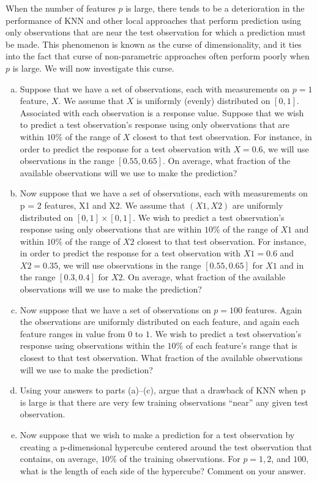 \documentclass[14pt]{elegantbook}
\begin{document}
\begin{exercise*}[4.4]
  When the number of features $p$ is large, there tends to be a deterioration in the performance of KNN and other local approaches that perform prediction using only observations that are near the test observation for which a prediction must be made. This phenomenon is known as the curse of dimensionality, and it ties into the fact that curse of non-parametric approaches often perform poorly when $p$ is large. We will now investigate this curse. 
  \begin{enumerate}[(a)]
    \item Suppose that we have a set of observations, each with measurements on $p = 1$ feature, $X$. We assume that $X$ is uniformly (evenly) distributed on $[0, 1]$. Associated with each observation is a response value. Suppose that we wish to predict a test observation's response using only observations that are within $10\%$ of the range of $X$ closest to that test observation. For instance, in order to predict the response for a test observation with $X = 0.6$, we will use observations in the range $[0.55,0.65]$. On average, what fraction of the available observations will we use to make the prediction? 
    \item Now suppose that we have a set of observations, each with measurements on p = 2 features, X1 and X2. We assume that $(X1, X2)$ are uniformly distributed on $[0, 1] \times [0, 1]$. We wish to predict a test observation's response using only observations that are within $10 \%$ of the range of $X1$ and within $10 \% $ of the range of $X2$ closest to that test observation. For instance, in order to predict the response for a test observation with $X1 = 0.6$ and $X2 = 0.35$, we will use observations in the range $[0.55, 0.65]$ for $X1$ and in the range $[0.3,0.4]$ for $X2$. On average, what fraction of the available observations will we use to make the prediction? 
    \item Now suppose that we have a set of observations on $p = 100$ features. Again the observations are uniformly distributed on each feature, and again each feature ranges in value from $0$ to $1$. We wish to predict a test observation's response using observations within the $10 \%$ of each feature's range that is closest to that test observation. What fraction of the available observations will we use to make the prediction? 
    \item Using your answers to parts (a)–(c), argue that a drawback of KNN when p is large is that there are very few training observations “near” any given test observation.
    \item Now suppose that we wish to make a prediction for a test observation by creating a p-dimensional hypercube centered around the test observation that contains, on average, $10 \%$ of the training observations. For $p = 1,2$, and $100$, what is the length of each side of the hypercube? Comment on your answer. 
    

\end{enumerate}
\end{exercise*}
\end{document}
